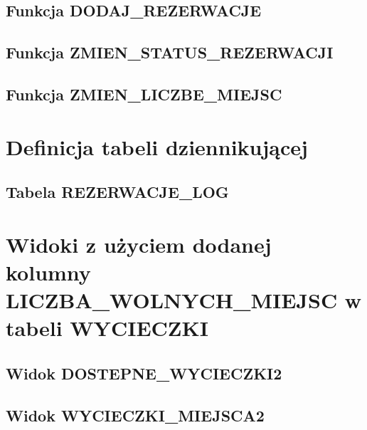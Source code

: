 \documentclass[a4paper, 11pt]{article}
\begin{document}
    \subsection{Funkcja DODAJ\_REZERWACJE}
    

    \newpage

    \subsection{Funkcja ZMIEN\_STATUS\_REZERWACJI}
    

    \newpage

    \subsection{Funkcja ZMIEN\_LICZBE\_MIEJSC}
    

    \newpage


    \section{Definicja tabeli dziennikującej}

    \subsection{Tabela REZERWACJE\_LOG}
    

    \newpage


    \section{Widoki z użyciem dodanej kolumny \newline LICZBA\_WOLNYCH\_MIEJSC
    w tabeli WYCIECZKI}

    \subsection{Widok DOSTEPNE\_WYCIECZKI2}
    


    \subsection{Widok WYCIECZKI\_MIEJSCA2}
    
\end{document}
